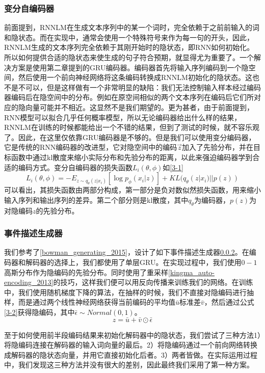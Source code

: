\documentclass[]{template}
\begin{document}
\subsubsection{变分自编码器}
前面提到，RNNLM在生成文本序列中的某一个词时，完全依赖于之前前输入的词和隐状态。而在实现中，通常会使用一个特殊符号来作为每一句的开头，因此，RNNLM生成的文本序列完全依赖于其刚开始时的隐状态，即RNN如何初始化。所以如何提供合适的隐状态来使生成的句子符合预期，就显得尤为重要了。一个解决方案是使用第二章提到的GRU编码器。编码器首先将输入序列编码到一个隐空间，然后使用一个前向神经网络将这条编码转换成RNNLM初始化的隐状态。这也不是不可以，但是这样做有一个非常明显的缺陷：我们无法控制输入样本经过编码器编码后在隐空间中的分布。例如在原空间相似的两个文本序列在编码后它们所对应的隐向量可能并不相近。这显然不是我们期望的。更为甚者，由于前面提到，RNN模型可以拟合几乎任何概率模型，所以无论编码器给出什么样的结果，RNNLM在训练的时候都能给出一个不错的结果，但到了测试的时候，就不容乐观了。因此，在这里仅依靠GRU编码器是不够的。但是我们可以使用变分编码器，它是传统的RNN编码器的改进型，它对隐空间中的编码\(\overrightarrow{z}\)加入了先验分布，并在目标函数中通过kl散度来缩小实际分布和先验分布的距离，以此来强迫编码器学到合适的编码方式。变分自编码器的损失函数$L_i(\theta,\phi)$如\ref{3-1}
\begin{equation}\label{3-1}
    L_i(\theta,\phi)=-E_{z\sim q_\theta(z|x_i)}[\log p_\phi(x_i|z)]+KL (q_\theta(z|x_i)||p(z))
\end{equation}
可以看出，其损失函数由两部分构成，第一部分是负对数似然损失函数，用来缩小输入序列和输出序列的差异。第二个部分则是kl散度，其中$q_\theta$为编码器，$p(z)$为对隐编码$z$的先验分布。

\subsubsection{事件描述生成器}
我们参考了\ref{bowman_generating_2015}，设计了如下事件描述生成器\ref{}。在编码器和解码器的选择上，我们都使用了单层GRU。在实现过程中，我们使用$0-1$高斯分布作为隐编码的先验分布。同时使用了重采样\ref{kingma_auto-encoding_2013}的技巧，这样我们便可以用反向传播来训练我们的网络。在训练中，我们使用随机梯度下降的算法，在抽样的时候，我们不直接对隐编码进行抽样，而是通过两个线性神经网络获得当前编码的平均值$\bar{u}$标准差$\bar{v}$，然后通过公式\ref{3-2}获得隐编码，其中$\bar\epsilon \sim Normal(0,1)$。
\begin{equation}\label{3-2}
    z=\bar{u}+\bar{v}\odot \bar\epsilon
\end{equation}

至于如何使用前半段编码结果来初始化解码器中的隐状态，我们尝试了三种方法1）将隐编码连接在解码器的输入词向量的最后。2）将隐编码通过一个前向网络转换成解码器的隐状态向量，并用它直接初始化后者。3）两者皆做。在实际运用过程中，我们发现这三种方法并没有很大的差别，因此最终我们采用了第一种方案。
\end{document}
